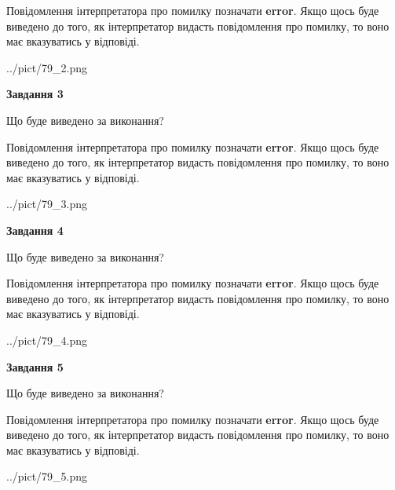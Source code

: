 \documentclass[12pt, ukrainian]{article}
\begin{document}
{\begin {large}
Повідомлення інтерпретатора про помилку позначати \textbf{error}.
Якщо щось буде виведено до того, як інтерпретатор видасть повідомлення про помилку, 
то воно має вказуватись у відповіді. \par


\begin{center}
	{../pict/79_2.png}
\end{center}
\newpage

{\begin {center}\textbf{Завдання 3}\end {center}}\par
Що буде виведено за виконання?

Повідомлення інтерпретатора про помилку позначати \textbf{error}.
Якщо щось буде виведено до того, як інтерпретатор видасть повідомлення про помилку, 
то воно має вказуватись у відповіді. \par


\begin{center}
	{../pict/79_3.png}
\end{center}
\newpage

{\begin {center}\textbf{Завдання 4}\end {center}}\par
Що буде виведено за виконання?

Повідомлення інтерпретатора про помилку позначати \textbf{error}.
Якщо щось буде виведено до того, як інтерпретатор видасть повідомлення про помилку, 
то воно має вказуватись у відповіді. \par


\begin{center}
	{../pict/79_4.png}
\end{center}
\newpage

{\begin {center}\textbf{Завдання 5}\end {center}}\par
Що буде виведено за виконання?

Повідомлення інтерпретатора про помилку позначати \textbf{error}.
Якщо щось буде виведено до того, як інтерпретатор видасть повідомлення про помилку, 
то воно має вказуватись у відповіді. \par


\begin{center}
	{../pict/79_5.png}
\end{center}
\newpage


\end{large}}
\end{document}
